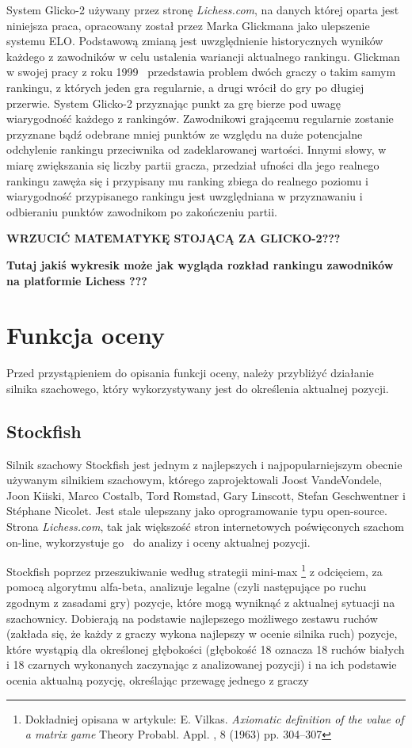 \documentclass[inzynierska]{pwr_wmat_praca_dyplomowa}
\theoremstyle{plain}
\numberwithin{theorem}{chapter}
\theoremstyle{definition}
\numberwithin{theorem}{chapter}
\begin{document}
System Glicko-2  używany przez stronę \textit{Lichess.com}, na danych której oparta jest niniejsza praca, opracowany został przez Marka Glickmana jako ulepszenie systemu ELO. Podstawową zmianą jest uwzględnienie historycznych wyników każdego z zawodników w celu ustalenia wariancji aktualnego rankingu. Glickman w swojej pracy z roku 1999~\cite{glicko} przedstawia problem dwóch graczy o takim samym rankingu, z których jeden gra regularnie, a drugi wrócił do gry po długiej przerwie. System Glicko-2 przyznając punkt za grę bierze pod uwagę wiarygodność każdego z rankingów. Zawodnikowi grającemu regularnie zostanie przyznane bądź odebrane mniej punktów ze względu na duże potencjalne odchylenie rankingu przeciwnika od zadeklarowanej wartości. Innymi słowy, w miarę zwiększania się liczby partii gracza, przedział ufności dla jego realnego rankingu zawęża się i przypisany mu ranking zbiega do realnego poziomu i wiarygodność przypisanego rankingu jest uwzględniana w przyznawaniu i odbieraniu punktów zawodnikom po zakończeniu partii.

\textbf{WRZUCIĆ MATEMATYKĘ STOJĄCĄ ZA GLICKO-2???}

\textbf{Tutaj jakiś wykresik może jak wygląda rozkład rankingu zawodników na platformie Lichess ???}
\section{Funkcja oceny}
Przed przystąpieniem do opisania funkcji oceny, należy przybliżyć działanie silnika szachowego, który wykorzystywany jest do określenia aktualnej pozycji.
\subsection{Stockfish}
Silnik szachowy Stockfish \cite{stockfish} jest jednym z najlepszych i najpopularniejszym obecnie używanym silnikiem szachowym, którego zaprojektowali Joost VandeVondele, Joon Kiiski, Marco Costalb, Tord Romstad, Gary Linscott, Stefan Geschwentner i Stéphane Nicolet. Jest stale ulepszany jako oprogramowanie typu open-source. Strona \textit{Lichess.com}, tak jak większość stron internetowych poświęconych szachom on-line, wykorzystuje go~\cite{stockfish_lichess} do analizy i oceny aktualnej pozycji.

Stockfish poprzez przeszukiwanie według strategii mini-max \footnote{Dokładniej opisana w artykule: E. Vilkas. \textit{Axiomatic definition of the value of a matrix game} Theory Probabl. Appl. , 8 (1963) pp. 304–307} z odcięciem, za pomocą algorytmu alfa-beta, analizuje legalne (czyli następujące po ruchu zgodnym z zasadami gry) pozycje, które mogą wyniknąć z aktualnej sytuacji na szachownicy. Dobierają na podstawie najlepszego możliwego zestawu ruchów (zakłada się, że każdy z graczy wykona najlepszy w ocenie silnika ruch) pozycje, które wystąpią dla określonej głębokości (głębokość 18 oznacza 18 ruchów białych i 18 czarnych wykonanych zaczynając z analizowanej pozycji) i na ich podstawie ocenia aktualną pozycję, określając przewagę jednego z graczy
\end{document}

